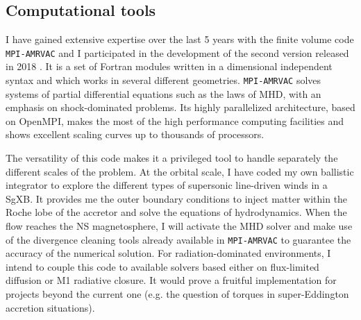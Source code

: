 \documentclass[letterpaper,12pt,onecolumn]{article}
\makeatletter
\newcommand{\sgx}{SgXB\xspace}
\newcommand*{\ns}{NS\@\xspace}
\newcommand*{\eg}{e.g.\@\xspace}
\makeatother
\begin{document}
%

\subsection*{Computational tools}

I have gained extensive expertise over the last 5 years with the finite volume code \texttt{MPI-AMRVAC} and I participated in the development of the second version released in 2018 \citep{Xia2017}. It is a set of Fortran modules written in a dimensional independent syntax and which works in several different geometries. \texttt{MPI-AMRVAC} solves systems of partial differential equations such as the laws of MHD, with an emphasis on shock-dominated problems. Its highly parallelized architecture, based on OpenMPI, makes the most of the high performance computing facilities and shows excellent scaling curves up to thousands of processors. 

The versatility of this code makes it a privileged tool to handle separately the different scales of the problem. At the orbital scale, I have coded my own ballistic integrator to explore the different types of supersonic line-driven winds in a \sgx. It provides me the outer boundary conditions to inject matter within the Roche lobe of the accretor and solve the equations of hydrodynamics. When the flow reaches the \ns magnetosphere, I will activate the MHD solver and make use of the divergence cleaning tools already available in \texttt{MPI-AMRVAC} to guarantee the accuracy of the numerical solution. For radiation-dominated environments, I intend to couple this code to available solvers based either on flux-limited diffusion or M1 radiative closure. It would prove a fruitful implementation for projects beyond the current one (\eg the question of torques in super-Eddington accretion situations).


%
%



\setlength{\bibsep}{1pt}


\end{document}
